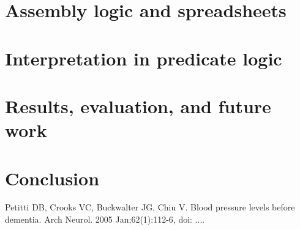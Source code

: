 \documentclass{IOS-Book-Article}
\begin{document}
\section{Assembly logic and spreadsheets}


\section{Interpretation in predicate logic}


\section{Results, evaluation, and future work}


\section{Conclusion}


\begin{thebibliography}{99}


Petitti DB, Crooks VC, Buckwalter JG, Chiu V. Blood pressure levels before dementia.
Arch Neurol. 2005 Jan;62(1):112-6, doi: ....

\end{thebibliography}
\end{document}
